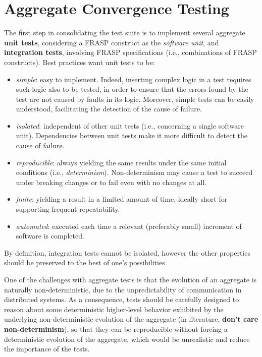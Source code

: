 
\section{Aggregate Convergence Testing}
\label{section:analysis:aggregate-convergence-testing}

The first step in consolidating the test suite is to implement several
aggregate \textbf{unit tests}, considering a FRASP construct as the
\textit{software unit}, and \textbf{integration tests}, involving FRASP
specifications (i.e., combinations of FRASP constructs). Best practices
\cite{UnitTesting} want unit tests to be:
\begin{itemize}
  \item \textit{simple}: easy to implement. Indeed, inserting complex logic in
        a test requires such logic also to be tested, in order to ensure that
        the errors found by the test are not caused by faults in its logic.
        Moreover, simple tests can be easily understood, facilitating the
        detection of the cause of failure.
  \item \textit{isolated}: independent of other unit tests (i.e., concerning
        a single software unit). Dependencies between unit tests make it more
        difficult to detect the cause of failure.
  \item \textit{reproducible}: always yielding the same results under the same
        initial conditions (i.e., \textit{determinism}). Non-determinism may
        cause a test to succeed under breaking changes or to fail even with
        no changes at all.
  \item \textit{finite}: yielding a result in a limited amount of time, ideally
        short for supporting frequent repeatability.
  \item \textit{automated}: executed each time a relevant (preferably small)
        increment of software is completed.
\end{itemize}

By definition, integration tests cannot be isolated, however the other
properties should be preserved to the best of one's possibilities.

One of the challenges with aggregate tests is that the evolution of an
aggregate is naturally non-deterministic, due to the unpredictability of
communication in distributed systems. As a consequence, tests should be
carefully designed to reason about some deterministic higher-level behavior
exhibited by the underlying non-deterministic evolution of the aggregate (in
literature, \textbf{don't care non-determinism}), so that they can be
reproducible without forcing a deterministic evolution of the aggregate, which
would be unrealistic and reduce the importance of the tests.

